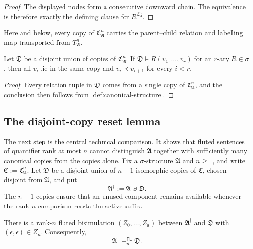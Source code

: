 \documentclass{lmcs}
\newcommand{\FL}{\mathsf{FL}}
\newcommand{\A}{\mathfrak{A}}
\newcommand{\C}{\mathfrak{C}}
\newcommand{\D}{\mathfrak{D}}
\begin{document}
\begin{proof}
The displayed nodes form a consecutive downward chain.  The equivalence is therefore exactly the defining clause for $R^{\C_{\A}^{n}}$.
\end{proof}

Here and below, every copy of $\C_{\A}^{n}$ carries the parent--child relation
and labelling map transported from $T_{\A}^{n}$.

\begin{prop}\label{prop:break}
Let $\D$ be a disjoint union of copies of $\C_{\A}^{n}$.  If
$\D\models R(v_1,\ldots,v_r)$ for an $r$-ary $R\in\sigma$, then all $v_i$
lie in the same copy and $v_i\prec v_{i+1}$ for every $i<r$.
\end{prop}

\begin{proof}
Every relation tuple in $\D$ comes from a single copy of $\C_{\A}^{n}$, and
the conclusion then follows from \cref{def:canonical-structure}.
\end{proof}

\subsection{The disjoint-copy reset lemma}\label{sec:reset}

The next step is the central technical comparison.  It shows that fluted
sentences of quantifier rank at most $n$ cannot distinguish $\A$ together with
sufficiently many canonical copies from the copies alone.  Fix a
$\sigma$-structure $\A$ and $n\geq1$, and write $\C:=\C_{\A}^{n}$.  Let
$\D$ be a disjoint union of $n+1$ isomorphic copies of $\C$, chosen disjoint
from $\A$, and put
\[
   \A^{\dagger}:=\A\uplus\D.
\]
The $n+1$ copies ensure that an unused component remains available whenever
the rank-$n$ comparison resets the active suffix.

\begin{lem}\label{lem:reset}
There is a rank-$n$ fluted bisimulation $(Z_0,\ldots,Z_n)$ between
$\A^{\dagger}$ and $\D$ with $(\epsilon,\epsilon)\in Z_n$.  Consequently,
\[
   \A^{\dagger}\equiv_n^{\FL}\D.
\]
\end{lem}
\end{document}
